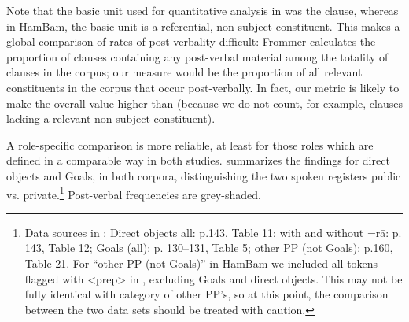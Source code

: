 \documentclass[output=paper,colorlinks,citecolor=brown,draftmode]{langscibook}
\begin{document}
\begin{table}
 \caption{Frequency of post-predicate elements in private and public genres of HamBam corpus}
 \label{Persian:tab:16}
\end{table}

Note that the basic unit used for quantitative analysis in \citet{frommer_post-verbal_1981} was the clause, whereas in HamBam, the basic unit is a referential, non-subject constituent. This makes a global comparison of rates of post-verbality difficult: Frommer calculates the proportion of clauses containing any post-verbal material among the totality of clauses in the corpus; our measure would be the proportion of all relevant constituents in the corpus that occur post-verbally. In fact, our metric is likely to make the overall value higher than  (because we do not count, for example, clauses lacking a relevant non-subject constituent). 

\largerpage[-3]
A role-specific comparison is more reliable, at least for those roles which are defined in a comparable way in both studies.  summarizes the findings for direct objects and Goals, in both corpora, distinguishing the two spoken registers public vs. private.\footnote{Data sources in \citet{frommer_post-verbal_1981}: Direct objects all: p.143, Table 11; with and without =rā: p. 143, Table 12; Goals (all): p. 130--131, Table 5; other PP (not Goals): p.160, Table 21. For ``other PP (not Goals)'' in HamBam we included all tokens flagged with <prep> in \citet{Izadi2022Persian}, excluding Goals and direct objects. This may not be fully identical with  category of other PP's, so at this point, the comparison between the two data sets should be treated with caution.} Post-verbal frequencies are grey-shaded.
\end{document}
